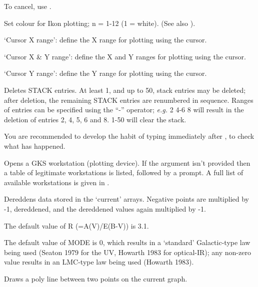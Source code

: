 \begin {description}
To cancel, use . 

Set colour for Ikon plotting; n = 1-12 (1 = white). (See also ). 

`Cursor X range': define the X range for plotting using the cursor.

`Cursor X \& Y range': define the X and Y ranges for plotting using
the cursor.

`Cursor Y range': define the Y range for plotting using the cursor.

Deletes STACK entries. At least 1, and up to 50, stack entries may be
deleted; after deletion, the remaining STACK entries are renumbered in
sequence. Ranges of entries can be specified using the ``-'' operator;
{\em e.g.}   2 4-6 8 will result in the deletion of entries 2, 4, 5,
6 and 8.   1-50 will clear the stack.

You are recommended to develop the habit of typing   immediately after
,  to check what has happened.

Opens a GKS workstation (plotting device). If the argument isn't
provided then a table of legitimate workstations is listed, followed
by a prompt. A full list of available workstations is given in
.

Dereddens data stored in the `current' arrays. Negative points are
multiplied by -1, dereddened, and the dereddened values again
multiplied by -1.

The default value of R (=A(V)/E(B-V)) is 3.1.

The default value of MODE is 0, which results in a `standard'
Galactic-type law being used (Seaton 1979 for the UV, Howarth 1983 for
optical-IR); any non-zero value results in an LMC-type law being used
(Howarth 1983).

Draws a poly line between two points on the current graph.


\end{description}
